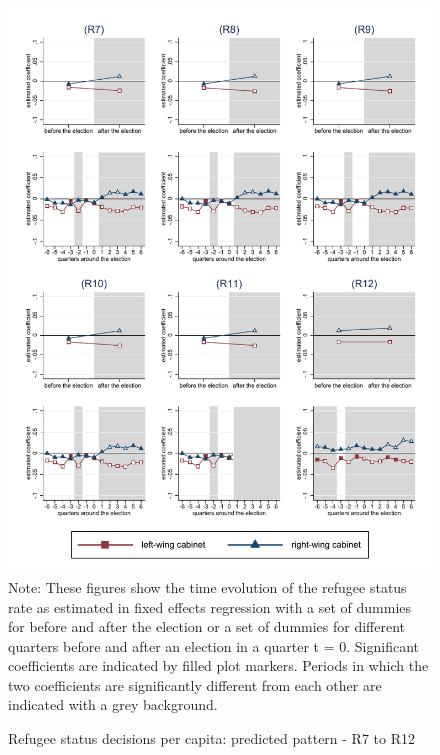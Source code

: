 \documentclass[11pt,a4paper]{scrartcl}
\begin{document}
%
%
%
%
%
%
%
%



\clearpage
\FloatBarrier


\clearpage
\FloatBarrier
\begin{figure}[!ht]
	\caption{Refugee status decisions per capita: predicted pattern - R7 to R12}
	\includegraphics[width=1\textwidth]{../results/decisions/refugeestatus_rate_graphs_R7-R12.pdf}
	\scriptsize{Note: These figures show the time evolution of the refugee status rate as estimated in fixed effects regression with a set of dummies for before and after the election or a set of dummies for different quarters before and after an election in a quarter t = 0. Significant coefficients are indicated by filled plot markers. Periods in which the two coefficients are significantly different from each other are indicated with a grey background.}
\end{figure}
\end{document}
